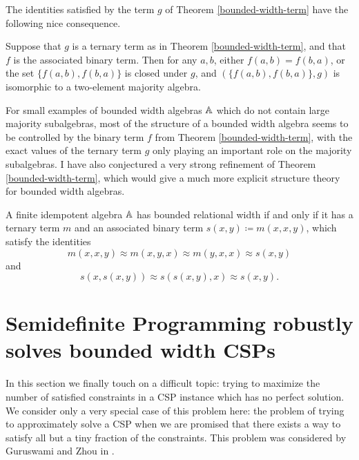 \documentclass[letterpaper,11pt]{article}
\begin{document}
The identities satisfied by the term $g$ of Theorem \ref{bounded-width-term} have the following nice consequence.

\begin{prop} Suppose that $g$ is a ternary term as in Theorem \ref{bounded-width-term}, and that $f$ is the associated binary term. Then for any $a,b$, either $f(a,b) = f(b,a)$, or the set $\{f(a,b), f(b,a)\}$ is closed under $g$, and $(\{f(a,b),f(b,a)\},g)$ is isomorphic to a two-element majority algebra.
\end{prop}

For small examples of bounded width algebras $\mathbb{A}$ which do not contain large majority subalgebras, most of the structure of a bounded width algebra seems to be controlled by the binary term $f$ from Theorem \ref{bounded-width-term}, with the exact values of the ternary term $g$ only playing an important role on the majority subalgebras. I have also conjectured a very strong refinement of Theorem \ref{bounded-width-term}, which would give a much more explicit structure theory for bounded width algebras.

\begin{conj} A finite idempotent algebra $\mathbb{A}$ has bounded relational width if and only if it has a ternary term $m$ and an associated binary term $s(x,y) \coloneqq m(x,x,y)$, which satisfy the identities
\[
m(x,x,y) \approx m(x,y,x) \approx m(y,x,x) \approx s(x,y)
\]
and
\[
s(x,s(x,y)) \approx s(s(x,y),x) \approx s(x,y).
\]
\end{conj}




\section{Semidefinite Programming robustly solves bounded width CSPs}

In this section we finally touch on a difficult topic: trying to maximize the number of satisfied constraints in a CSP instance which has no perfect solution. We consider only a very special case of this problem here: the problem of trying to approximately solve a CSP when we are promised that there exists a way to satisfy all but a tiny fraction of the constraints. This problem was considered by Guruswami and Zhou in \cite{robust-horn-gap}.
\end{document}
